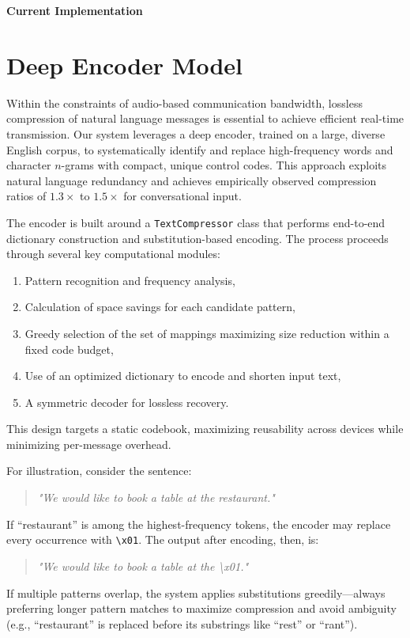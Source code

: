 \documentclass[12pt,openany]{article}
\theoremstyle{definition}
\theoremstyle{definition}
\theoremstyle{definition}
\begin{document}
\begin{center}
    \huge{\textbf{Current Implementation}}
\end{center}
\section*{Deep Encoder Model}
Within the constraints of audio-based communication bandwidth, lossless compression of natural language messages is essential to achieve efficient real-time transmission. Our system leverages a deep encoder, trained on a large, diverse English corpus, to systematically identify and replace high-frequency words and character $n$-grams with compact, unique control codes. This approach exploits natural language redundancy and achieves empirically observed compression ratios of $1.3\times$ to $1.5\times$ for conversational input.

The encoder is built around a \texttt{TextCompressor} class that performs end-to-end dictionary construction and substitution-based encoding. The process proceeds through several key computational modules:
\begin{enumerate}
    \item Pattern recognition and frequency analysis,
    \item Calculation of space savings for each candidate pattern,
    \item Greedy selection of the set of mappings maximizing size reduction within a fixed code budget,
    \item Use of an optimized dictionary to encode and shorten input text,
    \item A symmetric decoder for lossless recovery.
\end{enumerate}
This design targets a static codebook, maximizing reusability across devices while minimizing per-message overhead.

For illustration, consider the sentence:
\begin{quote}
\textit{"We would like to book a table at the restaurant."}
\end{quote}
If ``restaurant'' is among the highest-frequency tokens, the encoder may replace every occurrence with \verb|\x01|. The output after encoding, then, is:
\begin{quote}
\textit{"We would like to book a table at the \textbackslash x01."}
\end{quote}
If multiple patterns overlap, the system applies substitutions greedily---always preferring longer pattern matches to maximize compression and avoid ambiguity (e.g., ``restaurant'' is replaced before its substrings like ``rest'' or ``rant'').
\end{document}
